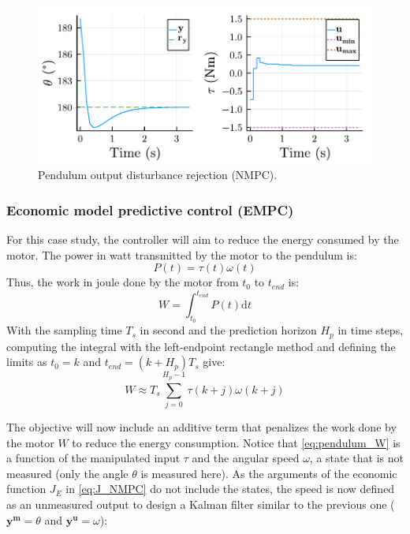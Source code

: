 \begin{figure}[ht]
    \centering
    \includegraphics[width=\columnwidth]{fig/plot_NonLinMPC3.pdf}
    \caption{Pendulum output disturbance rejection (NMPC).}\label{fig:plot_NonLinMPC3}
\end{figure}

\subsubsection{Economic model predictive control (EMPC)}

For this case study, the controller will aim to reduce the energy consumed by the motor. The power in watt transmitted by the motor to the pendulum is:
\begin{equation}
P(t) = \tau(t) \omega(t) 
\end{equation}
Thus, the work in joule done by the motor from $t_0$ to $t_{end}$ is:
\begin{equation}
W = \int_{t_0}^{t_{end}} P(t) \mathrm{d}t 
\end{equation}
With the sampling time $T_s$ in second and the prediction horizon $H_p$ in time steps, computing the integral with the left-endpoint rectangle method and defining the limits as $t_0=k$ and $t_{end} = (k + H_p) T_s$ give:
\begin{equation}\label{eq:pendulum_W}
W \approx T_s \sum_{j = 0}^{H_p - 1} \tau(k+j) \omega(k+j) 
\end{equation}

The objective will now include an additive term that penalizes the work done by the motor $W$ to reduce the energy consumption. Notice that \eqref{eq:pendulum_W} is a function of the manipulated input $\tau$ and the angular speed $\omega$, a state that is not measured (only the angle $\theta$ is measured here). As the arguments of the economic function $J_E$ in \eqref{eq:J_NMPC} do not include the states, the speed is now defined as an unmeasured output to design a Kalman filter similar to the previous one ($\mathbf{y^m} = \theta$ and $\mathbf{y^u} = \omega$): 


